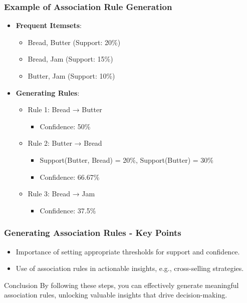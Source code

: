 \documentclass[aspectratio=169]{beamer}
\begin{document}
\begin{frame}[fragile]
    \frametitle{Example of Association Rule Generation}
    \begin{itemize}
        \item \textbf{Frequent Itemsets}:
        \begin{itemize}
            \item {Bread, Butter} (Support: 20\%)
            \item {Bread, Jam} (Support: 15\%)
            \item {Butter, Jam} (Support: 10\%)
        \end{itemize}
        \item \textbf{Generating Rules}:
        \begin{itemize}
            \item Rule 1: Bread → Butter
            \begin{itemize}
                \item Confidence: 50\%
            \end{itemize}
            \item Rule 2: Butter → Bread
            \begin{itemize}
                \item Support({Butter, Bread}) = 20\%, Support({Butter}) = 30\%
                \item Confidence: 66.67\%
            \end{itemize}
            \item Rule 3: Bread → Jam
            \begin{itemize}
                \item Confidence: 37.5\%
            \end{itemize}
        \end{itemize}
    \end{itemize}
\end{frame}

\begin{frame}[fragile]
    \frametitle{Generating Association Rules - Key Points}
    \begin{itemize}
        \item Importance of setting appropriate thresholds for support and confidence.
        \item Use of association rules in actionable insights, e.g., cross-selling strategies.
    \end{itemize}
    \begin{block}{Conclusion}
        By following these steps, you can effectively generate meaningful association rules, unlocking valuable insights that drive decision-making.
    \end{block}
\end{frame}
\end{document}
